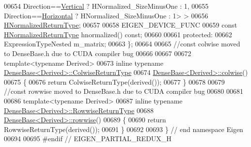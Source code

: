 \begin{DoxyCode}
00654                   Direction==\hyperlink{group__enums_ggad49a7b3738e273eb00932271b36127f7addca718e0564723df21d61b94b1198be}{Vertical}   ? HNormalized\_SizeMinusOne : 1,
00655                   Direction==\hyperlink{group__enums_ggad49a7b3738e273eb00932271b36127f7aae8a16b3b9272683c1162915f6d892be}{Horizontal} ? HNormalized\_SizeMinusOne : 1> >
00656             \hyperlink{group___core___module_class_eigen_1_1_cwise_binary_op}{HNormalizedReturnType};
00657 
00658     EIGEN\_DEVICE\_FUNC
00659     \textcolor{keyword}{const} \hyperlink{group___core___module_class_eigen_1_1_cwise_binary_op}{HNormalizedReturnType} hnormalized() \textcolor{keyword}{const};
00660 
00661   \textcolor{keyword}{protected}:
00662     ExpressionTypeNested m\_matrix;
00663 \};
00664 
00665 \textcolor{comment}{//const colwise moved to DenseBase.h due to CUDA compiler bug}
00666 
00667 
00672 \textcolor{keyword}{template}<\textcolor{keyword}{typename} Derived>
00673 \textcolor{keyword}{inline} \textcolor{keyword}{typename} \hyperlink{group___core___module_class_eigen_1_1_vectorwise_op}{DenseBase<Derived>::ColwiseReturnType}
00674 \hyperlink{group___core___module_a978724c07b70cb9b8fdef67a4de08788}{DenseBase<Derived>::colwise}()
00675 \{
00676   \textcolor{keywordflow}{return} ColwiseReturnType(derived());
00677 \}
00678 
00679 \textcolor{comment}{//const rowwise moved to DenseBase.h due to CUDA compiler bug}
00680 
00681 
00686 \textcolor{keyword}{template}<\textcolor{keyword}{typename} Derived>
00687 \textcolor{keyword}{inline} \textcolor{keyword}{typename} \hyperlink{group___core___module_class_eigen_1_1_vectorwise_op}{DenseBase<Derived>::RowwiseReturnType}
00688 \hyperlink{group___core___module_af9662cd704ffc16c5b88c7b2d331576f}{DenseBase<Derived>::rowwise}()
00689 \{
00690   \textcolor{keywordflow}{return} RowwiseReturnType(derived());
00691 \}
00692 
00693 \} \textcolor{comment}{// end namespace Eigen}
00694 
00695 \textcolor{preprocessor}{#endif // EIGEN\_PARTIAL\_REDUX\_H}
\end{DoxyCode}

